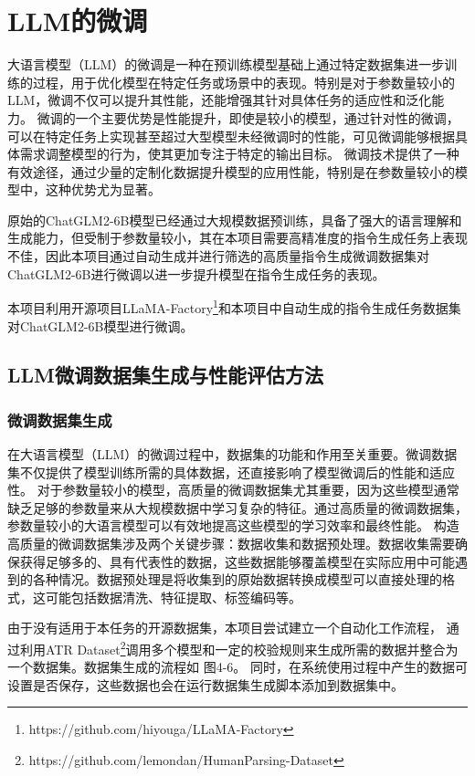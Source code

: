 \documentclass[a4paper,AutoFakeBold,oneside,12pt]{book}
\begin{document}
\section{LLM的微调} %
大语言模型（LLM）的微调是一种在预训练模型基础上通过特定数据集进一步训练的过程，用于优化模型在特定任务或场景中的表现。特别是对于参数量较小的LLM，微调不仅可以提升其性能，还能增强其针对具体任务的适应性和泛化能力。
微调的一个主要优势是性能提升，即使是较小的模型，通过针对性的微调，可以在特定任务上实现甚至超过大型模型未经微调时的性能，可见微调能够根据具体需求调整模型的行为，使其更加专注于特定的输出目标。
微调技术提供了一种有效途径，通过少量的定制化数据提升模型的应用性能，特别是在参数量较小的模型中，这种优势尤为显著。

原始的ChatGLM2-6B模型已经通过大规模数据预训练，具备了强大的语言理解和生成能力，但受制于参数量较小，其在本项目需要高精准度的指令生成任务上表现不佳，因此本项目通过自动生成并进行筛选的高质量指令生成微调数据集对ChatGLM2-6B进行微调以进一步提升模型在指令生成任务的表现。

本项目利用开源项目LLaMA-Factory\footnote{https://github.com/hiyouga/LLaMA-Factory}和本项目中自动生成的指令生成任务数据集对ChatGLM2-6B模型进行微调。
\subsection{LLM微调数据集生成与性能评估方法}
\subsubsection{微调数据集生成}
在大语言模型（LLM）的微调过程中，数据集的功能和作用至关重要。微调数据集不仅提供了模型训练所需的具体数据，还直接影响了模型微调后的性能和适应性。
对于参数量较小的模型，高质量的微调数据集尤其重要，因为这些模型通常缺乏足够的参数量来从大规模数据中学习复杂的特征。通过高质量的微调数据集，参数量较小的大语言模型可以有效地提高这些模型的学习效率和最终性能。
构造高质量的微调数据集涉及两个关键步骤：数据收集和数据预处理。数据收集需要确保获得足够多的、具有代表性的数据，这些数据能够覆盖模型在实际应用中可能遇到的各种情况。数据预处理是将收集到的原始数据转换成模型可以直接处理的格式，这可能包括数据清洗、特征提取、标签编码等。

由于没有适用于本任务的开源数据集，本项目尝试建立一个自动化工作流程，
通过利用ATR Dataset\footnote{https://github.com/lemondan/HumanParsing-Dataset}调用多个模型和一定的校验规则来生成所需的数据并整合为一个数据集。数据集生成的流程如 图4-6。
同时，在系统使用过程中产生的数据可设置是否保存，这些数据也会在运行数据集生成脚本添加到数据集中。
\end{document}
